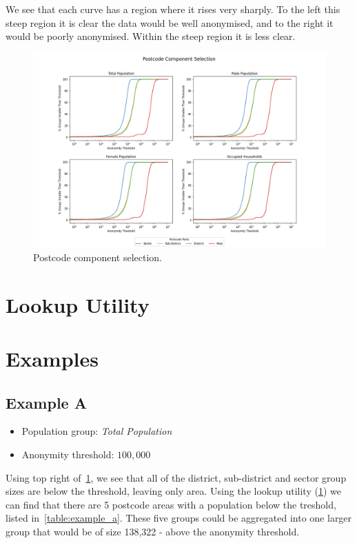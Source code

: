 \documentclass[12pt, a4paper]{article}
\begin{document}
We see that each curve has a region where it rises very sharply. To the left this steep region it is clear the data would be well anonymised, and to the right it would be poorly anonymised. Within the steep region it is less clear.

\begin{figure}
\includegraphics[width=1\textwidth,trim={3cm, 0cm, 3cm, 0cm},clip]{images/postcode_selection.png}
\caption{Postcode component selection.}\label{fig:postcode_selection}
\end{figure}

\section{Lookup Utility}\label{lookup-utlity}

\section{Examples}
\subsection{Example A}
\begin{itemize}
\item Population group: \textit{Total Population}
\item Anonymity threshold: $100,000$
\end{itemize}
Using top right of~\cref{fig:postcode_selection}, we see that all of the district, sub-district and sector group sizes are below the threshold, leaving only area. Using the lookup utility (\cref{lookup-utlity}) we can find that there are 5 postcode areas with a population below the treshold, listed in~\cref{table:example_a}. These five groups could be aggregated into one larger group that would be of size 138,322 - above the anonymity threshold.
\end{document}
